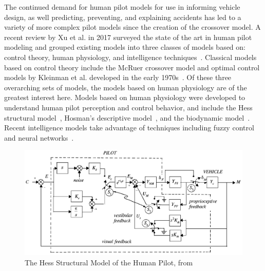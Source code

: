 \documentclass[float=false, crop=false]{standalone}
\begin{document}
The continued demand for human pilot models for use in informing vehicle design, as well predicting, preventing, and explaining accidents has led to a variety of more complex pilot models since the creation of the crossover model.
A recent review by Xu et al. in 2017 surveyed the state of the art in human pilot modeling and grouped existing models into three classes of models based on: control theory, human physiology, and intelligence techniques~\cite{Xu2017}.
Classical models based on control theory include the McRuer crossover model and optimal control models by Kleinman et al. developed in the early 1970s~\cite{Kleinman1970, Baron1970}.
Of these three overarching sets of models, the models based on human physiology are of the greatest interest here.
Models based on human physiology were developed to understand human pilot perception and control behavior, and include the Hess structural model~\cite{Hess1980, Hess1990, Hess1997}, Hosman's descriptive model~\cite{Hosman1996, Hosman1999}, and the biodynamic model~\cite{Griffin2001}.
Recent intelligence models take advantage of techniques including fuzzy control and neural networks~\cite{Zaychik2006, Gestwa}.

\begin{figure}[tb!]
    \begin{center}
        \includegraphics[width=0.8\linewidth]{./../img/Screen Shot 2018-07-31 at 11.21.44 AM.png}
        \caption{The Hess Structural Model of the Human Pilot, from~\cite{Hess1997}}
        \label{figure:structuralmodel}
    \end{center}
\end{figure}
\end{document}
